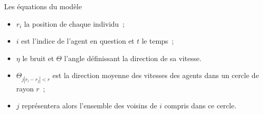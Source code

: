 \documentclass[aspectratio=43, a4paper, 12pt]{beamer}
\begin{document}
\begin{frame}{Les équations du modèle}

		\begin{itemize}
				   \item<1-3> $r_{i}$ la position de chaque individu~;
				   \item<2-3> $i$ est l'indice de l'agent en question et $t$ le temps~;
				   \item<3-3> $\eta$ le bruit et $\Theta$ l'angle définissant la direction de sa vitesse.
		\end{itemize}
				
		\vspace{-2cm} 
		\begin{itemize}
				   \item<4-> $\Theta_{j |r_{i}-r_{j}|<r}$ est la direction moyenne des vitesses des agents dans un cercle de rayon $r$~;
					\item<5->  $j$ représentera alors l'ensemble des voisins de $i$ compris dans ce cercle.		
					
		\end{itemize}
	\end{frame}
	
\end{document}
